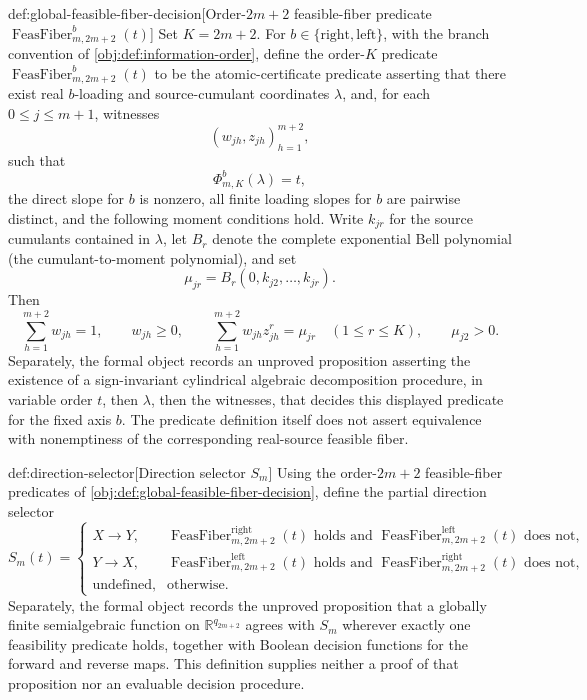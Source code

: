 \begin{definitionv}{def:global-feasible-fiber-decision}[Order-\(2m+2\) feasible-fiber predicate \(\operatorname{FeasFiber}^{b}_{m,2m+2}(t)\)]
Set \(K=2m+2\). For \(b\in\{\mathrm{right},\mathrm{left}\}\), with the branch convention of \cref{obj:def:information-order}, define the order-\(K\) predicate \(\operatorname{FeasFiber}^{b}_{m,2m+2}(t)\) to be the atomic-certificate predicate asserting that there exist real \(b\)-loading and source-cumulant coordinates \(\lambda\), and, for each \(0\leq j\leq m+1\), witnesses
\[
(w_{jh},z_{jh})_{h=1}^{m+2},
\]
such that
\[
\Phi^b_{m,K}(\lambda)=t,
\]
the direct slope for \(b\) is nonzero, all finite loading slopes for \(b\) are pairwise distinct, and the following moment conditions hold. Write \(k_{jr}\) for the source cumulants contained in \(\lambda\), let \(B_r\) denote the complete exponential Bell polynomial (the cumulant-to-moment polynomial), and set
\[
\mu_{jr}=B_r(0,k_{j2},\ldots,k_{jr}).
\]
Then
\[
\sum_{h=1}^{m+2} w_{jh}=1,\qquad
w_{jh}\geq 0,\qquad
\sum_{h=1}^{m+2} w_{jh}z_{jh}^r=\mu_{jr}\quad(1\leq r\leq K),
\qquad
\mu_{j2}>0.
\]
Separately, the formal object records an unproved proposition asserting the existence of a sign-invariant cylindrical algebraic decomposition procedure, in variable order \(t\), then \(\lambda\), then the witnesses, that decides this displayed predicate for the fixed axis \(b\). The predicate definition itself does not assert equivalence with nonemptiness of the corresponding real-source feasible fiber.
\end{definitionv}

\begin{definitionv}{def:direction-selector}[Direction selector \(S_m\)]
Using the order-\(2m+2\) feasible-fiber predicates of \cref{obj:def:global-feasible-fiber-decision}, define the partial direction selector
\[
S_m(t)=
\begin{cases}
X\to Y,&\operatorname{FeasFiber}^{\mathrm{right}}_{m,2m+2}(t)\text{ holds and }\operatorname{FeasFiber}^{\mathrm{left}}_{m,2m+2}(t)\text{ does not},\\
Y\to X,&\operatorname{FeasFiber}^{\mathrm{left}}_{m,2m+2}(t)\text{ holds and }\operatorname{FeasFiber}^{\mathrm{right}}_{m,2m+2}(t)\text{ does not},\\
\text{undefined},&\text{otherwise}.
\end{cases}
\]
Separately, the formal object records the unproved proposition that a globally finite semialgebraic function on \(\mathbb R^{q_{2m+2}}\) agrees with \(S_m\) wherever exactly one feasibility predicate holds, together with Boolean decision functions for the forward and reverse maps. This definition supplies neither a proof of that proposition nor an evaluable decision procedure.
\end{definitionv}

